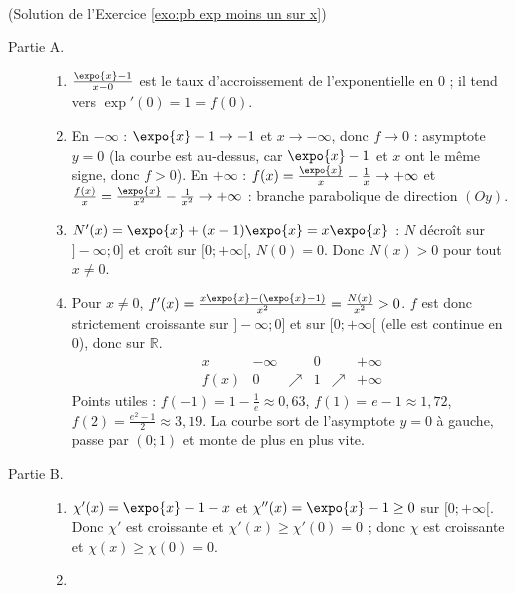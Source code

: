 \begin{corrige}
\begin{sol} ~ \\
(Solution de l'Exercice \ref{exo:pb exp moins un sur x})
\begin{description}
\item[Partie A.] \begin{enumerate}
      \item $\frac{\expo{x} - 1}{x - 0}$ est le taux d'accroissement de l'exponentielle en $0$ ; il tend vers $\exp'(0) = 1 = f(0)$.
      \item En $-\infty$ : $\expo{x} - 1 \to -1$ et $x \to -\infty$, donc $f \to 0$ : asymptote $y = 0$ (la courbe est au-dessus,
            car $\expo{x} - 1$ et $x$ ont le m\^eme signe, donc $f > 0$).
            En $+\infty$ : $f(x) = \frac{\expo{x}}{x} - \frac{1}{x} \to +\infty$ et $\frac{f(x)}{x} = \frac{\expo{x}}{x^2} - \frac{1}{x^2} \to +\infty$ :
            branche parabolique de direction $(Oy)$.
      \item $N'(x) = \expo{x} + (x - 1)\expo{x} = x\expo{x}$ : $N$ d\'ecro\^it sur $]-\infty ; 0]$ et cro\^it sur $[0 ; +\infty[$,
            $N(0) = 0$. Donc $N(x) > 0$ pour tout $x \neq 0$.
      \item Pour $x \neq 0$, $f'(x) = \frac{x\expo{x} - (\expo{x} - 1)}{x^2} = \frac{N(x)}{x^2} > 0$. $f$ est donc strictement croissante
            sur $]-\infty ; 0]$ et sur $[0 ; +\infty[$ (elle est continue en $0$), donc sur $\mathbb{R}$.
            \[
            \begin{array}{c|ccccc}
            x & -\infty & & 0 & & +\infty \\ \hline
            f(x) & 0 & \nearrow & 1 & \nearrow & +\infty
            \end{array}
            \]
            Points utiles : $f(-1) = 1 - \frac{1}{e} \approx 0{,}63$, $f(1) = e - 1 \approx 1{,}72$, $f(2) = \frac{e^2 - 1}{2} \approx 3{,}19$.
            La courbe sort de l'asymptote $y = 0$ \`a gauche, passe par $(0 ; 1)$ et monte de plus en plus vite.
      \end{enumerate}
\item[Partie B.] \begin{enumerate}
      \item $\chi'(x) = \expo{x} - 1 - x$ et $\chi''(x) = \expo{x} - 1 \geq 0$ sur $[0 ; +\infty[$. Donc $\chi'$ est croissante et
            $\chi'(x) \geq \chi'(0) = 0$ ; donc $\chi$ est croissante et $\chi(x) \geq \chi(0) = 0$.
      \item \begin{enumerate}

\end{enumerate}
\end{enumerate}
\end{description}
\end{sol}
\end{corrige}
